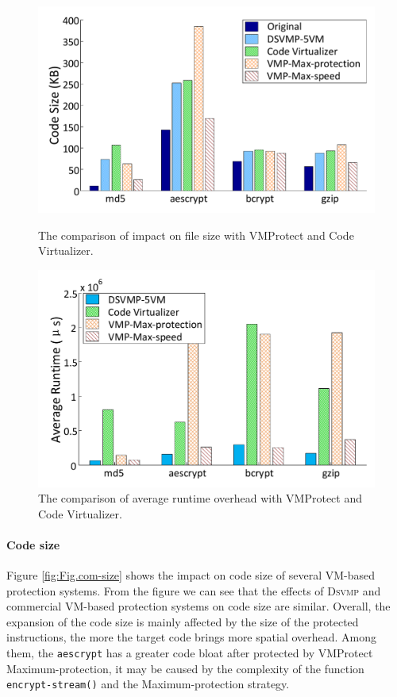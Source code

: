 \documentclass[preprint,12pt,3p]{elsarticle}
\newcommand{\DSVMP}{\textsc{Dsvmp }}
\begin{document}
\begin{figure}[t]
\centering
\begin{minipage}[t]{0.49\linewidth}
\centering
\includegraphics[width=.9\textwidth]{figure/comsize.pdf}
\caption{The comparison of impact on file size with VMProtect and Code Virtualizer.}\label{fig:Fig.com-size}
\end{minipage}
\hspace{0.005\textwidth}
\begin{minipage}[t]{0.49\linewidth}
\centering
\includegraphics[width=.9\textwidth]{figure/comtime.pdf}
\caption{The comparison of average runtime overhead with VMProtect and Code Virtualizer.}\label{fig:Fig.com-time}
\end{minipage}
\end{figure}


\paragraph*{Code size} Figure \ref{fig:Fig.com-size} shows the impact on code size of several VM-based protection systems.
From the figure we can see that the effects of \DSVMP and commercial VM-based protection systems on code size are similar.
Overall, the expansion of the code size is mainly affected by the size of the protected instructions,
the more the target code brings more spatial overhead.
Among them, the \texttt{aescrypt} has a greater code bloat after protected by VMProtect Maximum-protection,
it may be caused by the complexity of the function \texttt{encrypt-stream()} and the Maximum-protection strategy. 
\end{document}
